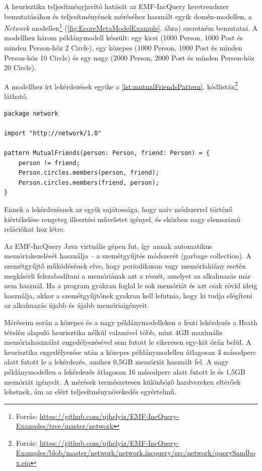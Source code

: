 A heurisztika teljesítményjavító hatását az EMF-IncQuery keretrendszer bemutatásához és teljesítményének méréséhez használt egyik domén-modellen, a \emph{Network} modellen\footnote{Forrás: \url{https://github.com/ujhelyiz/EMF-IncQuery-Examples/tree/master/network}} (\ref{fig:EcoreMetaModelExample}. ábra) szeretném bemutatni.
A modellhez három példánymodell készült: egy kicsi (1000 Person, 1000 Post és minden Person-höz 2 Circle), egy közepes (1000 Person, 1000 Post és minden Person-höz 10 Circle) és egy nagy (2000 Person, 2000 Post és minden Person-höz 20 Circle).

A modellhez írt lekérdezések egyike a \ref{lst:mutualFriendsPattern}. kódlistán\footnote{\raggedright Forrás: \url{https://github.com/ujhelyiz/EMF-IncQuery-Examples/blob/master/network/network.incquery/src/network/querySandbox.eiq}} látható.
\begin{lstlisting}[float,floatplacement=htb,caption=MutualFriends minta,label=lst:mutualFriendsPattern]
package network

import "http://network/1.0"

pattern MutualFriends(person: Person, friend: Person) = {
	person != friend;
	Person.circles.members(person, friend);
	Person.circles.members(friend, person);
}
\end{lstlisting}
Ennek a lekérdezésnek az egyik sajátossága, hogy naiv módszerrel történő kiértékelése rengeteg illesztési műveletet igényel, és eközben nagy elemszámú relációkat hoz létre.

Az EMF-IncQuery Java virtuális gépen fut, így annak automatikus memóriakezelését használja -- a szemétgyűjtés módszerét (garbage collection).
A szemétgyűjtő működésének elve, hogy periodikusan vagy memóriahiány esetén megkísérli felszabadítani a memóriának azt a részét, amelyet az alkalmazás már nem használ.
Ha a program gyakran foglal le sok memóriát és azt csak rövid ideig használja, akkor a szemétgyűjtőnek gyakran kell lefutnia, hogy ki tudja elégíteni az alkalmazás újabb és újabb memóriaigényeit.
 
Méréseim során a közepes és a nagy példánymodelleken a fenti lekérdezés a Heath tételén alapuló heurisztika nélkül valamivel több, mint 4GB maximális memóriahasználat engedélyezésével sem futott le sikeresen egy-két órán belül.
A heurisztika engedélyezése után a közepes példánymodellen átlagosan 3 másodperc alatt futott le a lekérdezés, amihez 0,5GB memóriát használt fel. A nagy példánymodellen a lekérdezés átlagosan 16 másodperc alatt futott le és 1,5GB memóriát igényelt.
A mérések természetesen különböző hardvereken eltérőek lehetnek, ám az elért teljesítménynövekedés egyértelmű.
